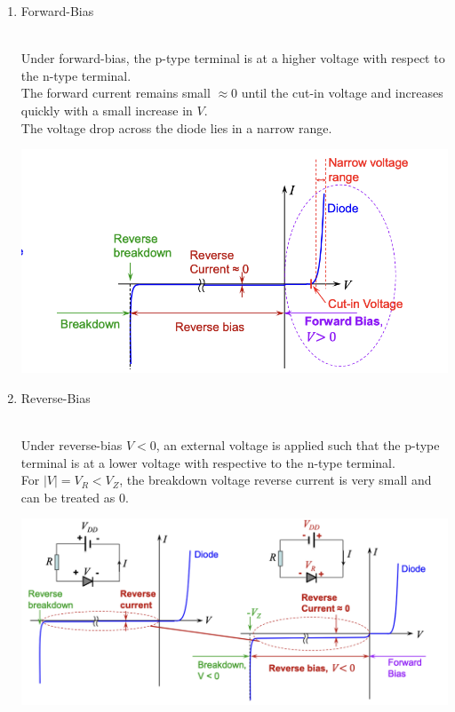 \documentclass{article}
\begin{document}
\begin{enumerate}
\begin{enumerate}
\begin{minipage}{0.6\textwidth}
            \end{minipage}
    \end{enumerate}
    \item Forward-Bias \\
    \\
    \begin{minipage}{0.4\textwidth}
        Under forward-bias, the p-type terminal is at a higher voltage with respect to the n-type terminal. \\
        The forward current remains small $\approx 0$ until the cut-in voltage and increases quickly with a small increase in $V$. \\
        The voltage drop across the diode lies in a narrow range.
    \end{minipage}
    \begin{minipage}{0.6\textwidth}
        \includegraphics[width=1\linewidth]{image/diodeforawd.png}
    \end{minipage}
    \item Reverse-Bias \\
    \\
    \begin{minipage}{0.4\textwidth}
        Under reverse-bias $V<0$, an external voltage is applied such that the p-type terminal is at a lower voltage with respective to the n-type terminal. \\       
        For $\displaystyle |V| = V_R < V_Z$, the breakdown voltage reverse current is very small and can be treated as 0.
    \end{minipage}
    \begin{minipage}{0.6\textwidth}
        \includegraphics[width=1\linewidth]{image/reversebias.png}

\end{minipage}
\end{enumerate}
\end{document}
